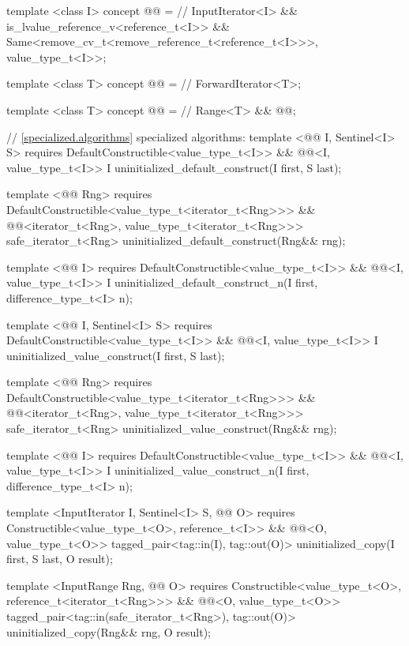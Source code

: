 {\color{addclr}
\begin{codeblock}
template <class I>
concept @@ = // \expos
  InputIterator<I> &&
  is_lvalue_reference_v<reference_t<I>> &&
  Same<remove_cv_t<remove_reference_t<reference_t<I>>>, value_type_t<I>>;

template <class T>
concept @@ = // \expos
  ForwardIterator<T>;

template <class T>
concept @@ = // \expos
  Range<T> && @@;

// \ref{specialized.algorithms} specialized algorithms:
template <@@ I, Sentinel<I> S>
requires
  DefaultConstructible<value_type_t<I>> &&
  @@<I, value_type_t<I>>
I uninitialized_default_construct(I first, S last);

template <@@ Rng>
requires
  DefaultConstructible<value_type_t<iterator_t<Rng>>> &&
  @@<iterator_t<Rng>, value_type_t<iterator_t<Rng>>>
safe_iterator_t<Rng> uninitialized_default_construct(Rng&& rng);

template <@@ I>
requires
  DefaultConstructible<value_type_t<I>> &&
  @@<I, value_type_t<I>>
I uninitialized_default_construct_n(I first, difference_type_t<I> n);

template <@@ I, Sentinel<I> S>
requires
  DefaultConstructible<value_type_t<I>> &&
  @@<I, value_type_t<I>>
I uninitialized_value_construct(I first, S last);

template <@@ Rng>
requires
  DefaultConstructible<value_type_t<iterator_t<Rng>>> &&
  @@<iterator_t<Rng>, value_type_t<iterator_t<Rng>>>
safe_iterator_t<Rng> uninitialized_value_construct(Rng&& rng);

template <@@ I>
requires
  DefaultConstructible<value_type_t<I>> &&
  @@<I, value_type_t<I>>
I uninitialized_value_construct_n(I first, difference_type_t<I> n);

template <InputIterator I, Sentinel<I> S, @@ O>
requires
  Constructible<value_type_t<O>, reference_t<I>> &&
  @@<O, value_type_t<O>>
tagged_pair<tag::in(I), tag::out(O)> uninitialized_copy(I first, S last, O result);

template <InputRange Rng, @@ O>
requires
  Constructible<value_type_t<O>, reference_t<iterator_t<Rng>>> &&
  @@<O, value_type_t<O>>
tagged_pair<tag::in(safe_iterator_t<Rng>), tag::out(O)> uninitialized_copy(Rng&& rng, O result);


\end{codeblock}}
